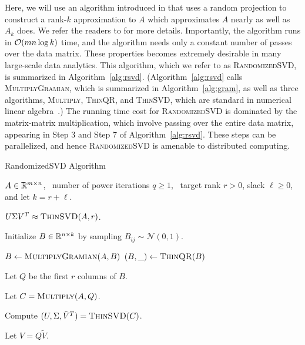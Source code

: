 Here, we will use an algorithm introduced in \cite{MRT06,MRT11}
that uses a random projection to construct a rank-$k$ approximation to $A$
which approximates $A$ nearly as well as $A_k$ does.  We refer the readers to
\cite{HMT09_SIREV,Mah-mat-rev_BOOK} for more details.  Importantly, the
algorithm runs in $\operatorname{\mathcal{O}}(mn \log k)$ time, and the algorithm needs only a
constant number of passes over the data matrix.  These properties becomes
extremely desirable in many large-scale data analytics.  This algorithm, which
we refer to as \textsc{RandomizedSVD}, is summarized in
Algorithm~\ref{alg:rsvd}.  (Algorithm~\ref{alg:rsvd} calls
\textsc{MultiplyGramian}, which is summarized in Algorithm~\ref{alg:gram}, as
well as three algorithms, \textsc{Multiply}, \textsc{ThinQR}, and
\textsc{ThinSVD}, which are standard in numerical linear algebra~\cite{GVL96}.)
The running time cost for \textsc{RandomizedSVD} is dominated by the
matrix-matrix multiplication, which involve passing over the entire data
matrix, appearing in Step 3 and Step 7 of Algorithm~\ref{alg:rsvd}.  
These steps can be parallelized, and hence \textsc{RandomizedSVD} is 
amenable to distributed computing.


\begin{algorithm}[tb]
 \caption{{\sc RandomizedSVD} Algorithm}
  \label{alg:rsvd}
  \begin{algorithmic}[1]
    \Require $A \in \mathbb{R}^{m\times n}$, \
      number of power iterations $q \ge 1$, \
      target rank $r > 0$, slack $\ell \ge 0$, and let $k=r+\ell$.

    \Ensure $U \Sigma V^T \approx \Call{ThinSVD}{A, r}$.

    \State Initialize $B \in \mathbb{R}^{n\times k}$ by sampling $B_{ij} \sim \mathcal{N}(0, 1)$.

    \For{$q$ times}
        \State $B \gets \Call{MultiplyGramian}{A, B}$
        \State $(B, \_) \gets \Call{ThinQR}{B}$
    \EndFor

    \State Let $Q$ be the first $r$ columns of $B$.

    \State Let $C = \Call{Multiply}{A, Q}$.

    \State Compute $(U, \Sigma, \tilde V^T) = \Call{ThinSVD}{C}$.

    \State Let $V = Q \tilde V$.

    \end{algorithmic}
\end{algorithm}

